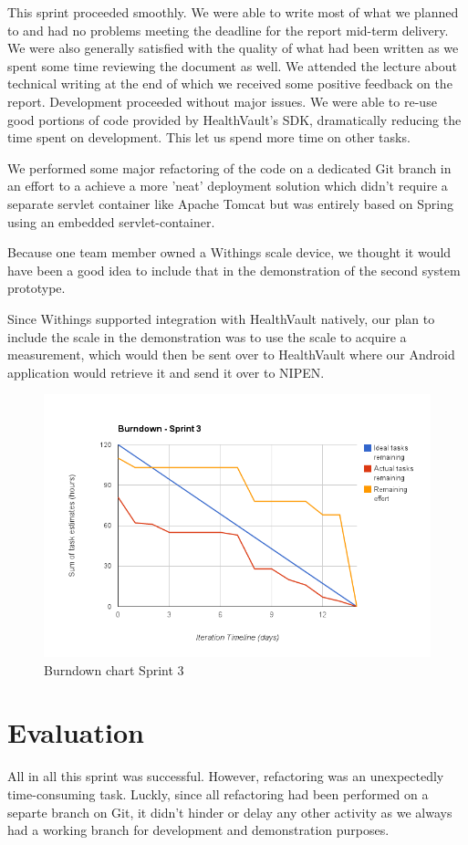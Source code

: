 This sprint proceeded smoothly. We were able to write most of what we planned to and had no problems meeting
the deadline for the report mid-term delivery.
We were also generally satisfied with the quality of what had been written as we spent some time
reviewing the document as well.
We attended the lecture about technical writing at the end of which we received some positive feedback on the report.
Development proceeded without major issues. We were able to re-use good portions of code provided
by HealthVault's SDK, dramatically reducing the time spent on development. This let us spend more
time on other tasks.

We performed some major refactoring of the code on a dedicated Git branch in an effort
to a achieve a more 'neat' deployment solution which didn't require a separate servlet container like
Apache Tomcat but was entirely based on Spring using an embedded servlet-container.


Because one team member owned a Withings scale device, we thought it would have been
a good idea to include that in the demonstration of the second system prototype.

Since Withings supported integration with HealthVault natively, our plan to include
the scale in the demonstration was to use the scale to acquire a measurement, which would
then be sent over to HealthVault where our Android application would retrieve it and
send it over to NIPEN.

\begin{figure}[H]
\centering
\includegraphics[scale=0.60]{../Figures/burndownSprint3.png}
\caption{Burndown chart Sprint 3}
\label{figure:burndownsprint3}
\end{figure}

\section{Evaluation}

All in all this sprint was successful.
However, refactoring was an unexpectedly time-consuming task.
Luckly, since all refactoring had been performed on a separte branch on Git, it didn't hinder
or delay any other activity as we always had a working branch for development and demonstration purposes.


